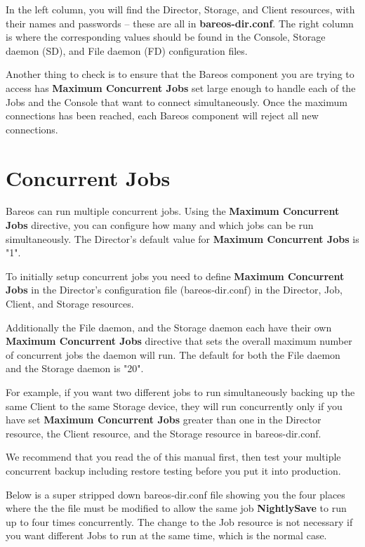    In the left column, you will find the Director, Storage, and  Client
   resources, with their names and passwords -- these  are all in {\bf
   bareos-dir.conf}. The right column is where the corresponding values
   should be found in the  Console, Storage daemon (SD), and File daemon (FD)
   configuration  files.  

   Another thing to check is to ensure that the Bareos component you are
   trying to access has {\bf Maximum Concurrent Jobs} set large enough to
   handle each of the Jobs and the Console that want to connect
   simultaneously.  Once the maximum connections has been reached, each
   Bareos component will reject all new connections.

\section{Concurrent Jobs}
\label{ConcurrentJobs}

Bareos can run multiple concurrent jobs. 
Using the {\bf Maximum Concurrent Jobs} directive, you
can configure how many and which jobs can be run simultaneously. 
The Director's default value for {\bf Maximum Concurrent Jobs} is "1".

To initially setup concurrent jobs you need to define {\bf Maximum Concurrent Jobs} in 
the Director's configuration file (bareos-dir.conf) in the 
Director, Job, Client, and Storage resources.

Additionally the File daemon, and the Storage daemon each have their own
{\bf Maximum Concurrent Jobs} directive that sets the overall maximum
number of concurrent jobs the daemon will run.  The default for both the
File daemon and the Storage daemon is "20".

For example, if you want two different jobs to run simultaneously backing up
the same Client to the same Storage device, they will run concurrently only if
you have set {\bf Maximum Concurrent Jobs} greater than one in the Director
resource, the Client resource, and the Storage resource in bareos-dir.conf. 

We recommend that you read the  of this manual first, then test your multiple
concurrent backup including restore testing before you put it into
production.

Below is a super stripped down bareos-dir.conf file showing you the four
places where the the file must be modified to allow the same job {\bf
NightlySave} to run up to four times concurrently. The change to the Job
resource is not necessary if you want different Jobs to run at the same time,
which is the normal case. 

